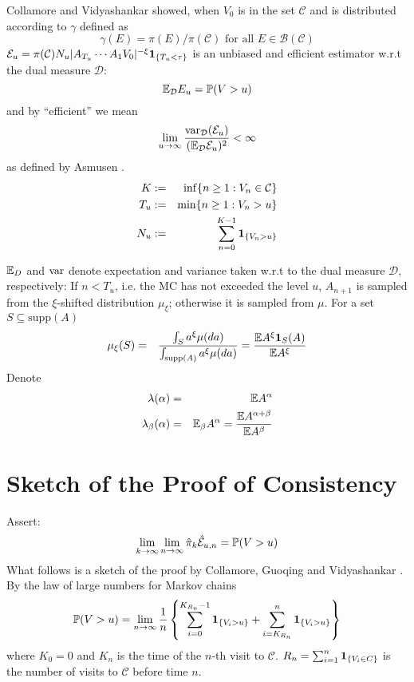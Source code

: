 \documentclass{beamer}
\begin{document}
\begin{frame}
  Collamore and Vidyashankar \cite{collamore2014} showed, when
  $V_0$ is in the set $\mathcal C$ and is distributed according to
  $\gamma$ defined as
  \[
  \gamma(E) = \pi(E)/\pi(\mathcal C)\text{ for all } E \in \mathcal B(\mathcal C)
  \]
  $\mathcal E_u = \pi(\mathcal C) N_u |A_{T_u} \cdots A_{1}
  V_0|^{-\xi}\1{T_u < \tau}$ is an unbiased and efficient estimator
  w.r.t the dual measure $\mathcal D$:
  \[
  \E_{\mathcal D} E_u = \P(V > u)
  \]
  and by ``efficient'' we mean
  \[
  \lim_{u \to \infty} {
    \var_{\mathcal D}(\mathcal E_u)
    \over
    (\E_{\mathcal D} \mathcal E_u)^2
  } < \infty
  \]
  as defined by Asmusen \cite{opac-b1123521}.
  \begin{eqnarray*}
    K &:=& \inf\{n \geq 1: V_n \in \mathcal C\} \\
    T_u &:=& \min\{n \geq 1: V_n > u\} \\
    N_u &:=& \sum_{n=0}^{K-1} \1{V_n > u}
  \end{eqnarray*}
\end{frame}

\begin{frame}
  $\E_D$ and $\var$ denote expectation and variance taken w.r.t to the
  dual measure $\mathcal D$, respectively: If $n < T_u$, i.e. the MC
  has not exceeded the level $u$, $A_{n+1}$ is sampled from the
  $\xi$-shifted distribution $\mu_\xi$; otherwise it is sampled from
  $\mu$. For a set $S \subseteq \text{supp}(A)$
  \begin{eqnarray*}
    \mu_\xi (S) &=& {
      \int_{S} a^\xi \mu(da)
      \over
      \int_{\text{supp}(A)} a^\xi \mu(da)
    } = {\E A^\xi \I{S}(A)
    \over
    \E A^\xi
    }
  \end{eqnarray*}
  Denote
  \begin{eqnarray*}
    \lambda(\alpha) &=& \E A^{\alpha} \\
    \lambda_\beta(\alpha) &=& \E_\beta A^{\alpha} = {
      \E A^{\alpha + \beta}
      \over
      \E A^{\beta}
    }
  \end{eqnarray*}
\end{frame}

\section{Sketch of the Proof of Consistency}
\begin{frame}
  Assert:
  \[
  \lim_{k \to \infty} \lim_{n \to \infty} \hat{\pi}_k \hat{\mathcal
    E}_{u,n} = \P(V > u)
  \]
  What follows is a sketch of the proof by Collamore, Guoqing and
  Vidyashankar \cite{collamore2014}. By the law of large numbers for
  Markov chains
  \[
  \P(V > u) = \lim_{n \to \infty} {1 \over n} \left\{
  \sum_{i=0}^{K_{R_n} - 1} \1{V_i > u}
  +
  \sum_{i=K_{R_n}}^{n} \1{V_i > u}
  \right\}
  \]
  where $K_0 = 0$ and $K_n$ is the time of the $n$-th visit to
  $\mathcal C$. $R_n = \sum_{i=1}^n \1{V_i \in C}$ is the number of
  visits to $\mathcal C$ before time $n$.
\end{frame}
\end{document}
